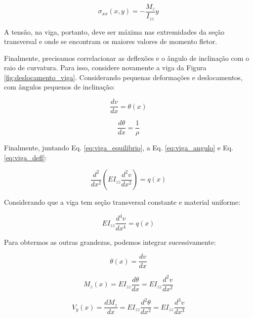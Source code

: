         \begin{equation}
            \sigma_{xx}(x,y) = -\frac{M_z}{I_{zz}}y
        \end{equation}

        A tensão, na viga, portanto, deve ser máxima nas extremidades da seção transversal e onde se encontram os maiores valores de momento fletor.

        Finalmente, precisamos correlacionar as deflexões e o ângulo de inclinação com o raio de curvatura. Para isso, considere novamente a viga da Figura \ref{fig:deslocamento_viga}. Considerando pequenas deformações e deslocamentos, com ângulos pequenos de inclinação:

        \begin{equation}
            \frac{dv}{dx} = \theta(x)
            \label{eq:viga_defl}
        \end{equation}

        \begin{equation}
            \frac{d\theta}{dx} = \frac{1}{\rho}
            \label{eq:viga_angulo}
        \end{equation}


        Finalmente, juntando Eq. \eqref{eq:viga_equilibrio}, a Eq. \eqref{eq:viga_angulo} e Eq. \eqref{eq:viga_defl}:

        \begin{equation}
            \frac{d^2}{dx^2}\left(EI_{zz}\frac{d^2v}{dx^2}\right) = q(x)
        \end{equation}

        Considerando que a viga tem seção transversal constante e material uniforme:

        \begin{equation}
            EI_{zz}\frac{d^4v}{dx^4} = q(x)
        \end{equation}

        Para obtermos as outras grandezas, podemos integrar sucessivamente:

        \begin{equation}
            \theta(x) = \frac{dv}{dx}
        \end{equation}

        \begin{equation}
            M_z(x) = EI_{zz}\frac{d\theta}{dx} = EI_{zz}\frac{d^2v}{dx^2}
        \end{equation}

        \begin{equation}
            V_y(x) = \frac{dM_z}{dx} = EI_{zz}\frac{d^2\theta}{dx^2} = EI_{zz}\frac{d^3v}{dx^3}
        \end{equation}


